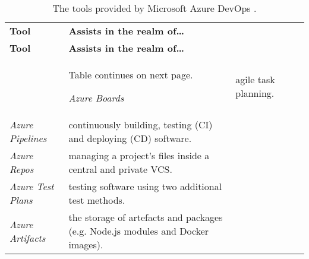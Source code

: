 \begin{longtable}{lXXX}
\label{tab:azure_devops}
\vspace{0.25cm}\\
\toprule
\textbf{Tool} & \textbf{Assists in the realm of\ldots} \\ 
\midrule
\endfirsthead
\toprule
\textbf{Tool} & \textbf{Assists in the realm of\ldots} \\ 
\midrule
\endhead
\midrule
& \hspace*{\fill} \small{Table continues on next page.}
\endfoot
\bottomrule
\caption[The tools provided by Microsoft Azure DevOps.]{The tools provided by Microsoft Azure DevOps \autocite{MicrosoftAzureDevOps2019}.}
\endlastfoot
\textit{Azure Boards} & agile task planning.\\
\textit{Azure Pipelines} & continuously building, testing (\ac{CI}) and deploying (\ac{CD}) software.\\
\textit{Azure Repos} & managing a project's files inside a central and private \ac{VCS}.\\
\textit{Azure Test Plans} & testing software using two additional test methods.\\
\textit{Azure Artifacts} & the storage of artefacts and packages (e.g. Node.js modules and Docker images).\\
\end{longtable}
